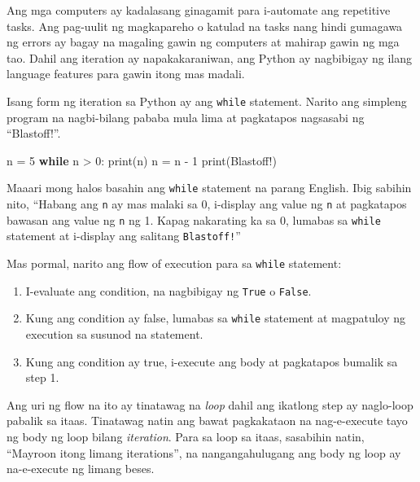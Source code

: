 \documentclass[10pt,]{book}
\newenvironment{Shaded}{}{}
\newcommand{\BuiltInTok}[1]{\textcolor[rgb]{0.00,0.50,0.00}{#1}}
\newcommand{\ControlFlowTok}[1]{\textcolor[rgb]{0.00,0.44,0.13}{\textbf{#1}}}
\newcommand{\DecValTok}[1]{\textcolor[rgb]{0.25,0.63,0.44}{#1}}
\newcommand{\NormalTok}[1]{#1}
\newcommand{\OperatorTok}[1]{\textcolor[rgb]{0.40,0.40,0.40}{#1}}
\newcommand{\StringTok}[1]{\textcolor[rgb]{0.25,0.44,0.63}{#1}}
\begin{document}
  

Ang mga computers ay kadalasang ginagamit para i-automate ang repetitive
tasks. Ang pag-uulit ng magkapareho o katulad na tasks nang hindi
gumagawa ng errors ay bagay na magaling gawin ng computers at mahirap
gawin ng mga tao. Dahil ang iteration ay napakakaraniwan, ang Python ay
nagbibigay ng ilang language features para gawin itong mas madali.

Isang form ng iteration sa Python ay ang \texttt{while} statement.
Narito ang simpleng program na nagbi-bilang pababa mula lima at
pagkatapos nagsasabi ng ``Blastoff!''.

\begin{Shaded}
\begin{Highlighting}[]
\NormalTok{n }\OperatorTok{=} \DecValTok{5}
\ControlFlowTok{while}\NormalTok{ n }\OperatorTok{\textgreater{}} \DecValTok{0}\NormalTok{:}
    \BuiltInTok{print}\NormalTok{(n)}
\NormalTok{    n }\OperatorTok{=}\NormalTok{ n }\OperatorTok{{-}} \DecValTok{1}
\BuiltInTok{print}\NormalTok{(}\StringTok{\textquotesingle{}Blastoff!\textquotesingle{}}\NormalTok{)}
\end{Highlighting}
\end{Shaded}

Maaari mong halos basahin ang \texttt{while} statement na parang
English. Ibig sabihin nito, ``Habang ang \texttt{n} ay mas malaki sa 0,
i-display ang value ng \texttt{n} at pagkatapos bawasan ang value ng
\texttt{n} ng 1. Kapag nakarating ka sa 0, lumabas sa \texttt{while}
statement at i-display ang salitang \texttt{Blastoff!}''


Mas pormal, narito ang flow of execution para sa \texttt{while}
statement:

\begin{enumerate}
\def\labelenumi{\arabic{enumi}.}
\item
  I-evaluate ang condition, na nagbibigay ng \texttt{True} o
  \texttt{False}.
\item
  Kung ang condition ay false, lumabas sa \texttt{while} statement at
  magpatuloy ng execution sa susunod na statement.
\item
  Kung ang condition ay true, i-execute ang body at pagkatapos bumalik
  sa step 1.
\end{enumerate}

Ang uri ng flow na ito ay tinatawag na \emph{loop} dahil ang ikatlong
step ay naglo-loop pabalik sa itaas. Tinatawag natin ang bawat
pagkakataon na nag-e-execute tayo ng body ng loop bilang
\emph{iteration}. Para sa loop sa itaas, sasabihin natin, ``Mayroon
itong limang iterations'', na nangangahulugang ang body ng loop ay
na-e-execute ng limang beses.
\end{document}
